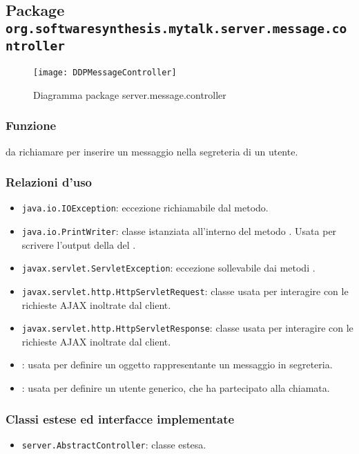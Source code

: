 \subsection{Package \texttt{org.softwaresynthesis.mytalk.server.message.controller}}\label{sec:messageServlet}

\begin{center}
\begin{figure}[H]
  \texttt{[image: DDPMessageController]}
\caption{Diagramma package server.message.controller}
\end{figure}
\end{center}


\subsubsection*{Funzione}
 da richiamare per inserire un messaggio nella segreteria di un utente.

\subsubsection*{Relazioni d'uso}
\begin{itemize}
	\item \texttt{java.io.IOException}: eccezione richiamabile dal metodo.
	\item \texttt{java.io.PrintWriter}: classe istanziata all'interno del metodo . Usata per scrivere l'output della del .
	\item \texttt{javax.servlet.ServletException}: eccezione sollevabile dai metodi .
	\item \texttt{javax.servlet.http.HttpServletRequest}: classe usata per interagire con le richieste AJAX inoltrate dal client.
	\item \texttt{javax.servlet.http.HttpServletResponse}: classe usata per interagire con le richieste AJAX inoltrate dal client.
	\item {}: usata per definire un oggetto rappresentante un messaggio in segreteria.
	\item {}: usata per definire un utente generico, che ha partecipato alla chiamata.
\end{itemize}

\subsubsection*{Classi estese ed interfacce implementate}
\begin{itemize}
	\item \texttt{server.AbstractController}: classe estesa.
\end{itemize}

